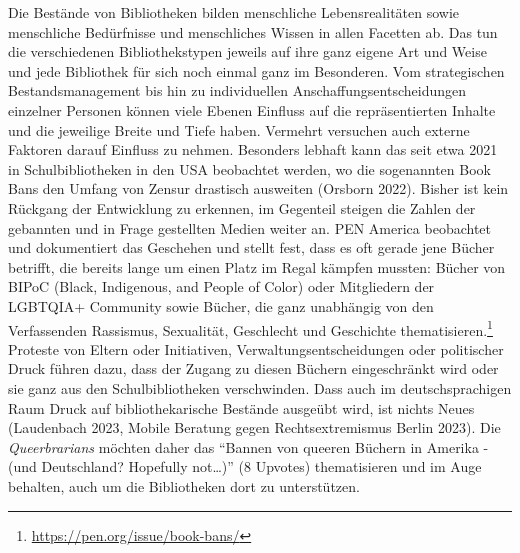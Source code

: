 \documentclass[a4paper,
fontsize=11pt,
oneside,
numbers=noperiodatend,
parskip=half-,
bibliography=totoc,
final
]{scrartcl}
\begin{document}
Die Bestände von Bibliotheken bilden menschliche Lebensrealitäten sowie
menschliche Bedürfnisse und menschliches Wissen in allen Facetten ab.
Das tun die verschiedenen Bibliothekstypen jeweils auf ihre ganz eigene
Art und Weise und jede Bibliothek für sich noch einmal ganz im
Besonderen. Vom strategischen Bestandsmanagement bis hin zu
individuellen Anschaffungsentscheidungen einzelner Personen können viele
Ebenen Einfluss auf die repräsentierten Inhalte und die jeweilige Breite
und Tiefe haben. Vermehrt versuchen auch externe Faktoren darauf
Einfluss zu nehmen. Besonders lebhaft kann das seit etwa 2021 in
Schulbibliotheken in den USA beobachtet werden, wo die sogenannten Book
Bans den Umfang von Zensur drastisch ausweiten (Orsborn 2022). Bisher
ist kein Rückgang der Entwicklung zu erkennen, im Gegenteil steigen die
Zahlen der gebannten und in Frage gestellten Medien weiter an. PEN
America beobachtet und dokumentiert das Geschehen und stellt fest, dass
es oft gerade jene Bücher betrifft, die bereits lange um einen Platz im
Regal kämpfen mussten: Bücher von BIPoC (Black, Indigenous, and People
of Color) oder Mitgliedern der LGBTQIA+ Community sowie Bücher, die ganz
unabhängig von den Verfassenden Rassismus, Sexualität, Geschlecht und
Geschichte thematisieren.\footnote{\url{https://pen.org/issue/book-bans/}}
Proteste von Eltern oder Initiativen, Verwaltungsentscheidungen oder
politischer Druck führen dazu, dass der Zugang zu diesen Büchern
eingeschränkt wird oder sie ganz aus den Schulbibliotheken verschwinden.
Dass auch im deutschsprachigen Raum Druck auf bibliothekarische Bestände
ausgeübt wird, ist nichts Neues (Laudenbach 2023, Mobile Beratung gegen
Rechtsextremismus Berlin 2023). Die \emph{Queerbrarians} möchten daher
das \enquote{Bannen von queeren Büchern in Amerika - (und Deutschland?
Hopefully not\ldots)} (8 Upvotes) thematisieren und im Auge behalten,
auch um die Bibliotheken dort zu unterstützen.
\end{document}
